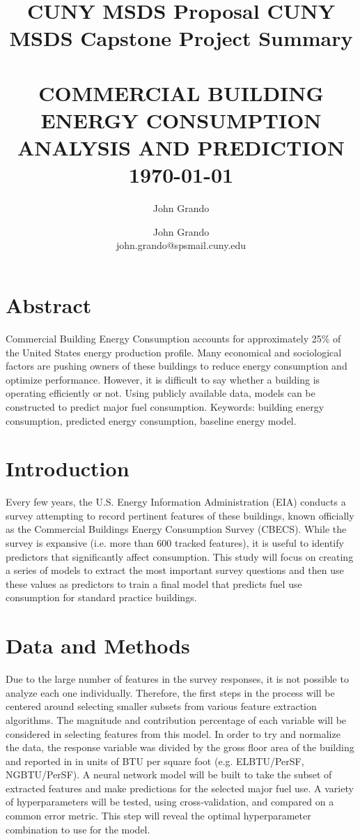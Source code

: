 \documentclass[12pt,letterpaper]{article}
\author{John Grando}
\title{CUNY MSDS Proposal}
\title{	\Large { CUNY MSDS Capstone Project Summary} 	%
		 	\\[2.0cm]								%
			\HRule{2pt} \\						%
			\LARGE \textbf{\uppercase{Commercial Building Energy Consumption}} \\ [0.25in] \Large \textbf{\uppercase{Analysis and Prediction}}	%
			\HRule{2pt} \\ [0.5cm]		%
			\Large \today			%
		}
\author{
		John Grando\\	
        john.grando@spsmail.cuny.edu \\
}
\makeatletter
\def\printtitle{%
    {\centering \@title\par}}
\def\printauthor{%
    {\centering \Large \@author}}
\makeatother
\begin{document}
\thispagestyle{empty}		%
\printtitle					%
  	\vfill
\printauthor				%
\newpage
\pagestyle{fancy}
\setcounter{page}{1}		%
\section*{Abstract}
Commercial Building Energy Consumption accounts for approximately 25\% of the United States energy production profile. Many economical and sociological factors are pushing owners of these buildings to reduce energy consumption and optimize performance. However, it is difficult to say whether a building is operating efficiently or not. Using publicly available data, models can be constructed to predict major fuel consumption. Keywords: building energy consumption, predicted energy consumption, baseline energy model.
\section*{Introduction}
Every few years, the U.S. Energy Information Administration (EIA) conducts a survey attempting to record pertinent features of these buildings, known officially as the Commercial Buildings Energy Consumption Survey (CBECS). While the survey is expansive (i.e. more than 600 tracked features), it is useful to identify predictors that significantly affect consumption. This study will focus on
creating a series of models to extract the most important survey questions and then use these values as predictors to train a final model that predicts fuel use consumption for standard practice buildings.
\section*{Data and Methods}
Due to the large number of features in the survey responses, it is not possible to analyze each one individually. Therefore, the first steps in the process will be centered around selecting smaller subsets from various feature extraction algorithms. The magnitude and contribution percentage of each variable will be considered in selecting features from this model. In order to try and
normalize the data, the response variable was divided by the gross floor area of the building and reported in in units of BTU per square foot (e.g. ELBTU/PerSF, NGBTU/PerSF). A neural network model will be built to take the subset of extracted features and make predictions for the selected major fuel use. A variety of hyperparameters will be tested, using cross‐validation, and compared on a common error metric. This step will reveal the optimal hyperparameter combination to use for the model.
\end{document}
